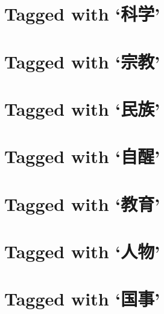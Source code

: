 \section*{Tagged with `\textbf{科学}'}

\section*{Tagged with `\textbf{宗教}'}

\section*{Tagged with `\textbf{民族}'}

\section*{Tagged with `\textbf{自醒}'}

\section*{Tagged with `\textbf{教育}'}

\section*{Tagged with `\textbf{人物}'}

\section*{Tagged with `\textbf{国事}'}
